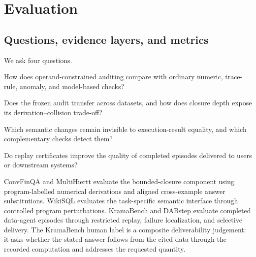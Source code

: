 
\section{Evaluation}
\label{sec:evaluation}

\subsection{Questions, evidence layers, and metrics}
\label{sec:setup}

We ask four questions.
\begin{description}
\setlength{\itemsep}{0pt}
\setlength{\parskip}{0pt}

\item[RQ1]
How does operand-constrained auditing compare with ordinary
numeric, trace-rule, anomaly, and model-based checks?

\item[RQ2]
Does the frozen audit transfer across datasets, and how does
closure depth expose its derivation--collision trade-off?

\item[RQ3]
Which semantic changes remain invisible to execution-result
equality, and which complementary checks detect them?

\item[RQ4]
Do replay certificates improve the quality of completed episodes
delivered to users or downstream systems?
\end{description}

ConvFinQA and MultiHiertt evaluate the bounded-closure component
using program-labelled numerical derivations and aligned
cross-example answer substitutions. WikiSQL evaluates the
task-specific semantic interface through controlled program
perturbations. KramaBench and DABstep evaluate completed
data-agent episodes through restricted replay, failure
localization, and selective delivery. The KramaBench human label
is a composite deliverability judgement: it asks whether the
stated answer follows from the cited data through the recorded
computation and addresses the requested quantity.

